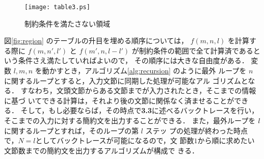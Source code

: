\begin{figure}[hbtp]
\vspace{-3mm}
 \begin{center}
\texttt{[image: table3.ps]}
  \caption{制約条件を満たさない領域}
  \label{fig:region2}
 \end{center}
\end{figure}

 図\ref{fig:region} のテーブルの升目を埋める順序については，
$f(m, n, l)$ を計算する際に $f(m, n', l')$ と $f(m', n, l-l')$
が制約条件の範囲で全て計算済であるという条件さえ満たしていればよいので，
その順序には大きな自由度がある．
変数 $l,m,n$ を動かすとき，アルゴリズム\ref{alg:recursion} のように最外
ループを $n$ に関するループとすると，入力文節に同期した処理が可能なアル
ゴリズムとなる．
すなわち，文頭文節からある文節までが入力されたとき，そこまでの情報に基づ
いてできる計算は，それより後の文節に関係なく済ませることができる．
そして，もし必要ならば，その時点で{\bf 3.3}に述べるバックトレースを行い，
そこまでの入力に対する簡約文を出力することができる．
また，最外ループを $l\/$ に関するループとすれば，そのループの第 $l$ ステッ
プの処理が終わった時点で，$N=l$としてバックトレースが可能になるので，文
節数$1$から順に求めたい文節数までの簡約文を出力するアルゴリズムが構成で
きる．

